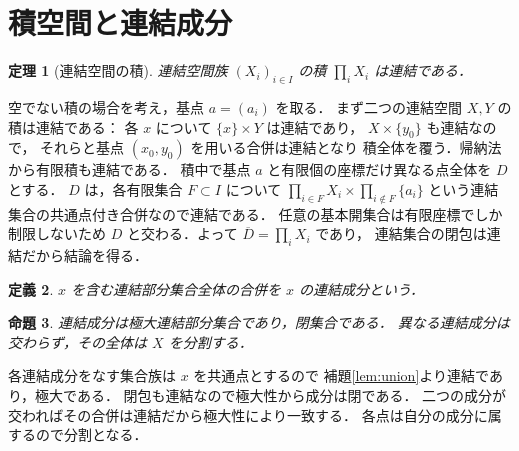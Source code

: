 \documentclass[a5paper,10pt,onecolumn]{jsarticle}
\makeatletter
\theoremstyle{mathnotetheorem}
\newtheorem{theorem}{定理}[section]
\newtheorem{definition}[theorem]{定義}
\newtheorem{proposition}[theorem]{命題}
\renewcommand{\proofname}{証明}
\renewenvironment{proof}[1][\proofname]{%
  \par\pushQED{\qed}\normalfont\topsep4\p@\@plus2\p@\relax
  \trivlist\item[\hskip\labelsep\bfseries #1]\ignorespaces
}{\popQED\endtrivlist\@endpefalse}
\makeatother
\begin{document}
\section{積空間と連結成分}
\begin{theorem}[連結空間の積]\label{thm:products}
連結空間族 $(X_i)_{i\in I}$ の積 $\prod_iX_i$ は連結である．
\end{theorem}
\begin{proof}
空でない積の場合を考え，基点 $a=(a_i)$ を取る．
まず二つの連結空間 $X,Y$ の積は連結である：
各 $x$ について $\{x\}\times Y$ は連結であり，
$X\times\{y_0\}$ も連結なので，
それらと基点 $(x_0,y_0)$ を用いる合併は連結となり
積全体を覆う．帰納法から有限積も連結である．
積中で基点 $a$ と有限個の座標だけ異なる点全体を $D$ とする．
$D$ は，各有限集合 $F\subset I$ について
$\prod_{i\in F}X_i\times\prod_{i\notin F}\{a_i\}$
という連結集合の共通点付き合併なので連結である．
任意の基本開集合は有限座標でしか制限しないため
$D$ と交わる．よって $\overline D=\prod_iX_i$ であり，
連結集合の閉包は連結だから結論を得る．
\end{proof}
\begin{definition}
$x$ を含む連結部分集合全体の合併を $x$ の連結成分という．
\end{definition}
\begin{proposition}
連結成分は極大連結部分集合であり，閉集合である．
異なる連結成分は交わらず，その全体は $X$ を分割する．
\end{proposition}
\begin{proof}
各連結成分をなす集合族は $x$ を共通点とするので
補題\ref{lem:union}より連結であり，極大である．
閉包も連結なので極大性から成分は閉である．
二つの成分が交わればその合併は連結だから極大性により一致する．
各点は自分の成分に属するので分割となる．
\end{proof}
\end{document}

